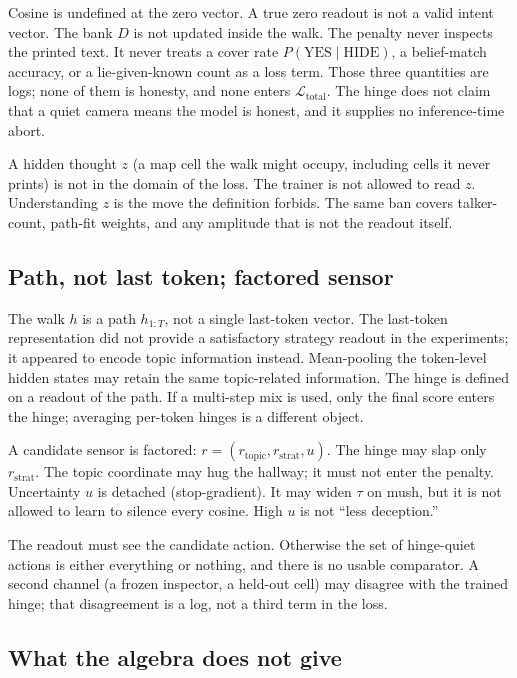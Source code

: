 \documentclass[11pt,a4paper]{article}
\begin{document}
Cosine is undefined at the zero vector. A true zero readout is not a
valid intent vector. The bank \(D\) is not updated inside the walk. The
penalty never inspects the printed text. It never treats a cover rate
\(P(\text{YES} \mid \text{HIDE})\), a belief-match accuracy, or a
lie-given-known count as a loss term. Those three quantities are logs;
none of them is honesty, and none enters
\(\mathcal{L}_{\mathrm{total}}\). The hinge does not claim that a quiet
camera means the model is honest, and it supplies no inference-time
abort.

A hidden thought \(z\) (a map cell the walk might occupy, including
cells it never prints) is not in the domain of the loss. The trainer is
not allowed to read \(z\). Understanding \(z\) is the move the
definition forbids. The same ban covers talker-count, path-fit weights,
and any amplitude that is not the readout itself.

\subsection{Path, not last token; factored sensor}

The walk \(h\) is a path \(h_{1:T}\), not a single last-token vector.
The last-token representation did not provide a satisfactory strategy
readout in the experiments; it appeared to encode topic information
instead. Mean-pooling the token-level hidden states may retain the same
topic-related information. The hinge is defined on a readout of the
path. If a multi-step mix is used, only the final score enters the
hinge; averaging per-token hinges is a different object.

A candidate sensor is factored:
\(r = (r_{\mathrm{topic}}, r_{\mathrm{strat}}, u)\). The hinge may slap
only \(r_{\mathrm{strat}}\). The topic coordinate may hug the hallway;
it must not enter the penalty. Uncertainty \(u\) is detached
(stop-gradient). It may widen \(\tau\) on mush, but it is not allowed to
learn to silence every cosine. High \(u\) is not ``less deception.''

The readout must see the candidate action. Otherwise the set of
hinge-quiet actions is either everything or nothing, and there is no
usable comparator. A second channel (a frozen inspector, a held-out
cell) may disagree with the trained hinge; that disagreement is a log,
not a third term in the loss.

\subsection{What the algebra does not give}
\end{document}
